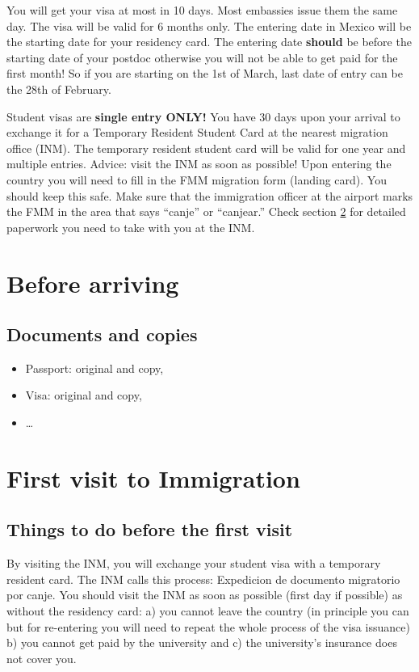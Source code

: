 \documentclass{article}
\begin{document}
\bigskip
\noindent
You will get your visa at most in 10 days. Most embassies issue them the same day. The visa will be valid for 6 months only. The entering date in Mexico will be the starting date for your residency card. The entering date \textbf{should} be before the starting date of your postdoc otherwise you will not be able to get paid for the first month! So if you are starting on the 1st of March, last date of entry can be the 28th of February. 

\bigskip
\noindent
Student visas are \textbf{single entry ONLY!} You have 30 days upon your arrival to exchange it for a Temporary Resident Student Card  at the nearest migration office (INM). The temporary resident student card will be valid for one year and multiple entries. Advice: visit the INM as soon as possible! Upon entering the country you will need to fill in the FMM migration form (landing card). You should keep this safe. Make sure that the immigration officer at the airport marks the FMM in the area that says ``canje'' or ``canjear.'' Check section \ref{Immi} for detailed paperwork you need to take with you at the INM.         


\section{Before arriving}

\subsection{Documents and copies}

\begin{itemize}
\item Passport: original and copy,
\item Visa: original and copy,
\item \ldots
\end{itemize}

\section{First visit to Immigration}\label{Immi}

\subsection{Things to do before the first visit}

By visiting the INM, you will exchange your student visa with a temporary resident card. The INM calls this process: Expedicion de documento migratorio por canje. You should visit the INM as soon as possible (first day if possible) as without the residency card: a) you cannot leave the country (in principle you can but for re-entering you will need to repeat the whole process of the visa issuance) b) you cannot get paid by the university and c) the university's insurance does not cover you. 
\end{document}
